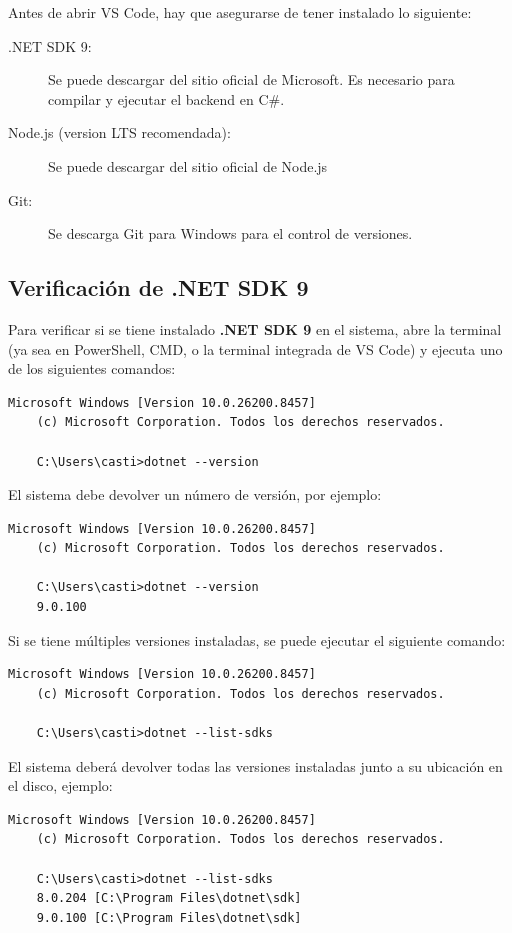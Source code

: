 \documentclass[
10pt, %
a4paper, %
oneside, %
headinclude,footinclude, %
BCOR5mm, %
]{scrartcl}
\begin{document}
Antes de abrir VS Code, hay que asegurarse de tener instalado lo siguiente:

\begin{description}
	\item[.NET SDK 9:] Se puede descargar del sitio oficial de Microsoft. Es necesario para compilar y ejecutar el backend en C\#.
	\item[Node.js (version LTS recomendada):] Se puede descargar del sitio oficial de Node.js
	\item[Git:] Se descarga Git para Windows para el control de versiones.
\end{description}

\subsection{Verificación de .NET SDK 9}
Para verificar si se tiene instalado \textbf{.NET SDK 9} en el sistema, abre la terminal (ya sea en PowerShell, CMD, o la terminal integrada de VS Code) y ejecuta uno de los siguientes comandos: 

\begin{lstlisting}[language=DOS]
	Microsoft Windows [Version 10.0.26200.8457]
	(c) Microsoft Corporation. Todos los derechos reservados.
	
	C:\Users\casti>dotnet --version
\end{lstlisting}

El sistema debe devolver un número de versión, por ejemplo:

\begin{lstlisting}[language=DOS]
	Microsoft Windows [Version 10.0.26200.8457]
	(c) Microsoft Corporation. Todos los derechos reservados.
	
	C:\Users\casti>dotnet --version
	9.0.100
\end{lstlisting}

Si se tiene múltiples versiones instaladas, se puede ejecutar el siguiente comando:
\begin{lstlisting}[language=DOS]
	Microsoft Windows [Version 10.0.26200.8457]
	(c) Microsoft Corporation. Todos los derechos reservados.
	
	C:\Users\casti>dotnet --list-sdks
\end{lstlisting}

El sistema deberá devolver todas las versiones instaladas junto a su ubicación en el disco, ejemplo:
\begin{lstlisting}[language=DOS]
	Microsoft Windows [Version 10.0.26200.8457]
	(c) Microsoft Corporation. Todos los derechos reservados.
	
	C:\Users\casti>dotnet --list-sdks
	8.0.204 [C:\Program Files\dotnet\sdk]
	9.0.100 [C:\Program Files\dotnet\sdk]
\end{lstlisting}
\end{document}
